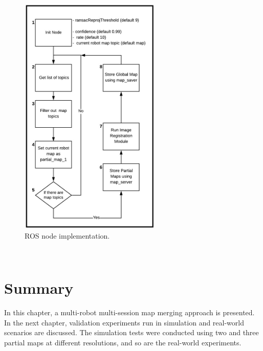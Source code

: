 \begin{figure}[H]
    \centering
    \includegraphics[width=0.6\textwidth]{UCT_MSc_Thesis/figs/implementation/ROSnodeImplementation.jpg}
    \caption{ROS node implementation.}
    \label{fig:ros-node-implementation}
\end{figure}
\


\section{Summary}

In this chapter, a multi-robot multi-session map merging approach is presented. In the next chapter, validation experiments run in simulation and real-world scenarios are discussed. The simulation tests were conducted using two and three partial maps at different resolutions, and so are the real-world experiments.

